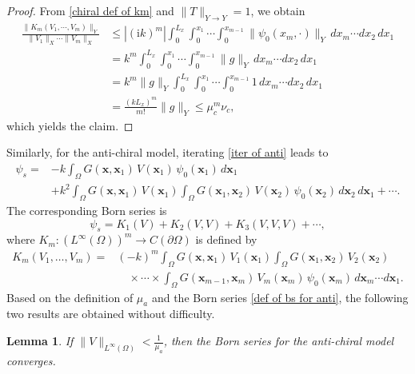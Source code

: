 \documentclass[12pt,reqno]{amsart}
\newtheorem{lem}[thm]{Lemma}
\begin{document}
\begin{proof}
From \eqref{chiral def of km} and $\|T\|_{Y\to Y}=1$, we obtain
\begin{align*}
\frac{\|K_m(V_1,\cdots,V_m)\|_Y}{\|V_1\|_X\cdots\|V_m\|_X}
&\le |(\mathrm{i}k)^m| \int_0^{L_x}\int_0^{x_1}\cdots\int_0^{x_{m-1}}\|\psi_0(x_m,\cdot)\|_Y\,dx_m\cdots dx_2\,dx_1\\
&= k^m\int_0^{L_x}\int_0^{x_1}\cdots\int_0^{x_{m-1}}\|g\|_Y\,dx_m\cdots dx_2\,dx_1\\
&=  k^m\|g\|_Y \int_0^{L_x}\int_0^{x_1}\cdots\int_0^{x_{m-1}}1\,dx_m\cdots dx_2\,dx_1\\
&= \frac{(kL_x)^m}{m!}\|g\|_Y
\le \mu_c^m \nu_c,
\end{align*}
which yields the claim.
\end{proof}

Similarly, for the anti-chiral model, iterating \eqref{iter of anti} leads to
\begin{equation}\label{def of bs for anti}
    \begin{aligned}
    \psi_s=&-k\int_{\Omega}G(\mathbf{x},\mathbf{x}_1)\,V(\mathbf{x}_1)\,\psi_0(\mathbf{x}_1)\,d\mathbf{x}_1\\
    &+k^2\int_{\Omega}G(\mathbf{x},\mathbf{x}_1)\,V(\mathbf{x}_1)\int_{\Omega}G(\mathbf{x}_1,\mathbf{x}_2)\,V(\mathbf{x}_2)\,\psi_0(\mathbf{x}_2)\,d\mathbf{x}_2\,d\mathbf{x}_1+\cdots.
\end{aligned}
\end{equation}
The corresponding Born series is
\[
    \psi_s=K_1(V)+K_2(V,V)+K_3(V,V,V)+\cdots,
\]
where $K_m:(L^{\infty}(\Omega))^m\to C(\partial\Omega)$ is defined by
\begin{equation}\label{antichiral def of km}
\begin{aligned}
K_m(V_1,\ldots,V_m)
={}& (-k)^m
\int_{\Omega}
G(\mathbf{x},\mathbf{x}_1)\,V_1(\mathbf{x}_1)
\int_{\Omega}
G(\mathbf{x}_1,\mathbf{x}_2)\,V_2(\mathbf{x}_2) \\
&\quad \times \cdots\times
\int_{\Omega}
G(\mathbf{x}_{m-1},\mathbf{x}_m)\,
V_m(\mathbf{x}_m)\,\psi_0(\mathbf{x}_m)\,
d\mathbf{x}_m\cdots d\mathbf{x}_1 .
\end{aligned}
\end{equation}
Based on the definition of $\mu_a$ and the Born series \eqref{def of bs for anti}, the following two results are obtained without difficulty.

\begin{lem}
If $\|V\|_{L^{\infty}(\Omega)}<\frac{1}{\mu_a}$, then the Born series for the anti-chiral model converges.
\end{lem}
\end{document}
